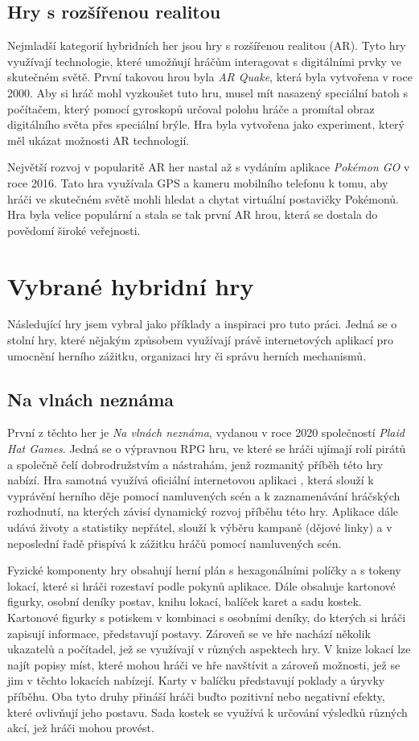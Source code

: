 \subsection{Hry s rozšířenou realitou}
Nejmladší kategorií hybridních her jsou hry s rozšířenou realitou (AR). Tyto hry využívají technologie, které umožňují hráčům interagovat s digitálními prvky ve skutečném světě. První takovou hrou byla \textit{AR Quake}, která byla vytvořena v roce 2000. Aby si hráč mohl vyzkoušet tuto hru, musel mít nasazený speciální batoh s počítačem, který pomocí gyroskopů určoval polohu hráče a promítal obraz digitálního světa přes speciální brýle. Hra byla vytvořena jako experiment, který měl ukázat možnosti AR technologií. \cite{ar_history}

Největší rozvoj v popularitě AR her nastal až s vydáním aplikace \textit{Pokémon GO} v roce 2016. Tato hra využívala GPS a kameru mobilního telefonu k tomu, aby hráči ve skutečném světě mohli hledat a chytat virtuální postavičky Pokémonů. Hra byla velice populární a stala se tak první AR hrou, která se dostala do povědomí široké veřejnosti.

\section{Vybrané hybridní hry}
Následující hry jsem vybral jako příklady a inspiraci pro tuto práci. Jedná se o stolní hry, které nějakým způsobem využívají právě internetových aplikací pro umocnění herního zážitku, organizaci hry či správu herních mechanismů.

\subsection{Na vlnách neznáma}
První z těchto her je \textit{Na vlnách neznáma}, vydanou v roce 2020 společností \textit{Plaid Hat Games}. Jedná se o výpravnou RPG hru, ve které se hráči ujímají rolí pirátů a společně čelí dobrodružstvím a nástrahám, jenž rozmanitý příběh této hry nabízí. Hra samotná využívá oficiální internetovou aplikaci \cite{forgotten_waters_app}, která slouží k vyprávění herního děje pomocí namluvených scén a k zaznamenávání hráčských rozhodnutí, na kterých závisí dynamický rozvoj příběhu této hry. Aplikace dále udává životy a statistiky nepřátel, slouží k výběru kampaně (dějové linky) a v neposlední řadě přispívá k zážitku hráčů pomocí namluvených scén.

Fyzické komponenty hry obsahují herní plán s hexagonálními políčky a s tokeny lokací, které si hráči rozestaví podle pokynů aplikace. Dále obsahuje kartonové figurky, osobní deníky postav, knihu lokací, balíček karet a sadu kostek. Kartonové figurky s potiskem v kombinaci s osobními deníky, do kterých si hráči zapisují informace, představují postavy. Zároveň se ve hře nachází několik ukazatelů a počítadel, jež se využívají v různých aspektech hry. V knize lokací lze najít popisy míst, které mohou hráči ve hře navštívit a zároveň možnosti, jež se jim v těchto lokacích nabízejí. Karty v balíčku představují poklady a úryvky příběhu. Oba tyto druhy přináší hráči buďto pozitivní nebo negativní efekty, které ovlivňují jeho postavu. Sada kostek se využívá k určování výsledků různých akcí, jež hráči mohou provést.

